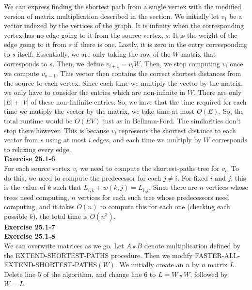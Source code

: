 \documentclass{article}
\begin{document}
We can express finding the shortest path from a single vertex with the modified version of matrix multiplication described in the section. We initially let $v_1$ be a vector indexed by the vertices of the graph. It is infinity when the corresponding vertex has no edge going to it from the source vertex, $s$. It is the weight of the edge going to it from $s$ if there is one. Lastly, it is zero in the entry corresponding to $s$ itself. Essentially, we are only taking the row of the $W$ matrix that corresponds to $s$. Then, we define $v_{i+1} = v_i W$. Then, we stop computing $v_i$ once we compute $v_{n-1}$. This vector then contains the correct shortest distances from the source to each vertex. Since each time we multiply the vector by the matrix, we only have to consider the entries which are non-infinite in $W$. There are only $|E|+|V|$ of these non-finfinite entries. So, we have that the time required for each time we mutiply the vector by the matrix, we take time at most $O(E)$. So, the total runtime would be $O(EV)$ just as in Bellman-Ford. The similarities don't stop there however. This is because $v_i$ represents the shortest distance to each vector from $s$ using at most $i$ edges, and each time we multiply by $W$ corresponds to relaxing every edge.\\

\noindent\textbf{Exercise 25.1-6}\\

For each source vertex $v_i$ we need to compute the shortest-paths tree for $v_i$.  To do this, we need to compute the predecessor for each $j \neq i$.  For fixed $i$ and $j$, this is the value of $k$ such that $L_{i,k} + w(k,j) = L_{i,j}$. Since there are $n$ vertices whose trees need computing, $n$ vertices for each such tree whose predecessors need computing, and it takes $O(n)$ to compute this for each one (checking each possible $k$), the total time is $O(n^3)$. \\

\noindent\textbf{Exercise 25.1-7}\\

\noindent\textbf{Exercise 25.1-8}\\

We can overwrite matrices as we go.  Let $A \star B$ denote multiplication defined by the EXTEND-SHORTEST-PATHS procedure.  Then we modify FASTER-ALL-EXTEND-SHORTEST-PATHS$(W)$.  We initially create an $n$ by $n$ matrix $L$.  Delete line 5 of the algorithm, and change line 6 to $L = W \star W$, followed by $W = L$.\\ 
\end{document}
